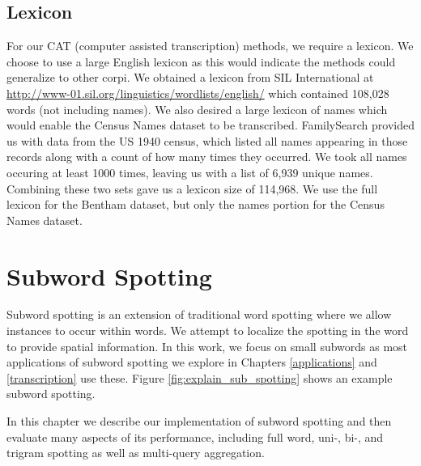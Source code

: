\documentclass[ms,electronic,twosidetoc,letterpaper,chaptercenter,parttop,lof,lot]{byumsphd}
\begin{document}
\section{Lexicon}

For our CAT (computer assisted transcription) methods, we require a lexicon. We choose to use a large English lexicon as this would indicate the methods could generalize to other corpi. We obtained a lexicon from SIL International at \url{http://www-01.sil.org/linguistics/wordlists/english/} which contained 108,028 words (not including names). We also desired a large lexicon of names which would enable the Census Names dataset to be transcribed. FamilySearch provided us with data from the US 1940 census, which listed all names appearing in those records along with a count of how many times they occurred. We took all names occuring at least 1000 times, leaving us with a list of 6,939 unique names. Combining these two sets gave us a lexicon size of 114,968. We use the full lexicon for the Bentham dataset, but only the names portion for the Census Names dataset.

\chapter{Subword Spotting}\label{subwordspotting}

Subword spotting is an extension of traditional word spotting where we allow instances to occur within words. We attempt to localize the spotting in the word to provide spatial information. In this work, we focus on small subwords as most applications of subword spotting we explore in Chapters \ref{applications} and \ref{transcription} use these. Figure \ref{fig:explain_sub_spotting} shows an example subword spotting.

In this chapter we describe our implementation of subword spotting and then evaluate many aspects of its performance, including full word, uni-, bi-, and trigram spotting as well as multi-query aggregation.
\end{document}
